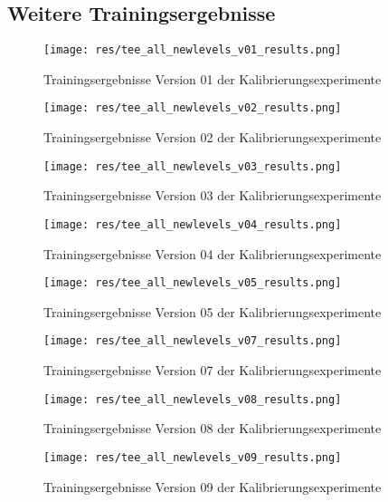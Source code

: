 \documentclass[11pt]{scrartcl}
\begin{document}
\subsection{Weitere Trainingsergebnisse}
\label{sec:further_train_results}

\begin{figure}[htp]
\centering
\texttt{[image: res/tee\_all\_newlevels\_v01\_results.png]}
\caption{Trainingsergebnisse Version 01 der Kalibrierungsexperimente}
\end{figure}

\begin{figure}[htp]
\centering
\texttt{[image: res/tee\_all\_newlevels\_v02\_results.png]}
\caption{Trainingsergebnisse Version 02 der Kalibrierungsexperimente}
\end{figure}

\begin{figure}[htp]
\centering
\texttt{[image: res/tee\_all\_newlevels\_v03\_results.png]}
\caption{Trainingsergebnisse Version 03 der Kalibrierungsexperimente}
\end{figure}

\begin{figure}[htp]
\centering
\texttt{[image: res/tee\_all\_newlevels\_v04\_results.png]}
\caption{Trainingsergebnisse Version 04 der Kalibrierungsexperimente}
\end{figure}

\begin{figure}[htp]
\centering
\texttt{[image: res/tee\_all\_newlevels\_v05\_results.png]}
\caption{Trainingsergebnisse Version 05 der Kalibrierungsexperimente}
\end{figure}

\begin{figure}[htp]
\centering
\texttt{[image: res/tee\_all\_newlevels\_v07\_results.png]}
\caption{Trainingsergebnisse Version 07 der Kalibrierungsexperimente}
\end{figure}

\begin{figure}[htp]
\centering
\texttt{[image: res/tee\_all\_newlevels\_v08\_results.png]}
\caption{Trainingsergebnisse Version 08 der Kalibrierungsexperimente}
\end{figure}

\begin{figure}[htp]
\centering
\texttt{[image: res/tee\_all\_newlevels\_v09\_results.png]}
\caption{Trainingsergebnisse Version 09 der Kalibrierungsexperimente}
\end{figure}
\end{document}
